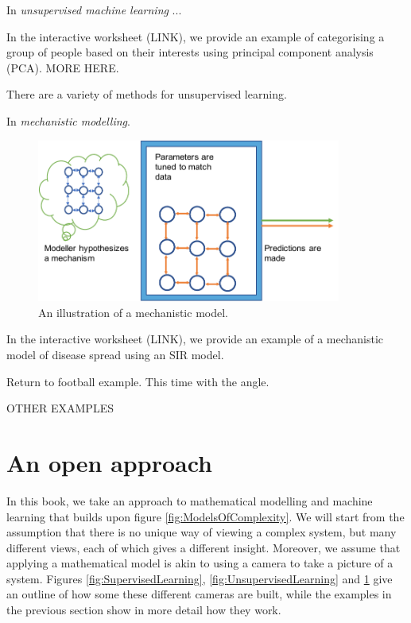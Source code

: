 In {\it unsupervised machine learning} ...

In the interactive worksheet (LINK), we provide an example of categorising a group of people based on their interests using principal component analysis (PCA). MORE HERE.

There are a variety of methods for unsupervised learning. 


In {\it mechanistic modelling}.

\begin{figure}[t]
\centering
\includegraphics[width=10cm]{Figures/Complexity/Mechanism.pdf}
\centering
\caption{An illustration of a mechanistic model.   \label{fig:Mechanism}}
\end{figure}


In the interactive worksheet (LINK), we provide an example of a mechanistic model of disease spread using an SIR model.

Return to football example. This time with the angle.


OTHER EXAMPLES


\section{An open approach}

In this book, we take an approach to mathematical modelling and machine learning that builds upon figure \ref{fig:ModelsOfComplexity}. We will start from the assumption that there is no unique way of viewing a complex system, but many different views, each of which gives a different insight. Moreover, we assume that applying a mathematical model is akin to using a camera to take a picture of a system. Figures \ref{fig:SupervisedLearning}, \ref{fig:UnsupervisedLearning} and \ref{fig:Mechanism} give an outline of how some these different cameras are built, while the examples in the previous section show in more detail how they work.

